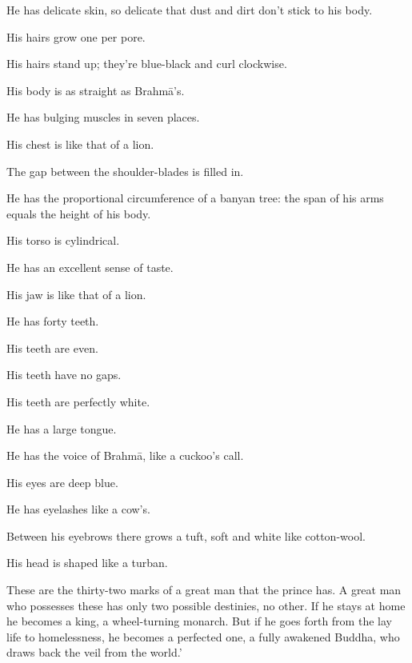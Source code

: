 \documentclass[12pt,openany]{book}%
\begin{document}
He has delicate skin, so delicate that dust and dirt don’t stick to his body. 

His hairs grow one per pore. 

His hairs stand up; they’re blue-black and curl clockwise. 

His body is as straight as \textsanskrit{Brahmā}’s. 

He has bulging muscles in seven places. 

His chest is like that of a lion. 

The gap between the shoulder-blades is filled in. 

He has the proportional circumference of a banyan tree: the span of his arms equals the height of his body. 

His torso is cylindrical. 

He has an excellent sense of taste. 

His jaw is like that of a lion. 

He has forty teeth. 

His teeth are even. 

His teeth have no gaps. 

His teeth are perfectly white. 

He has a large tongue. 

He has the voice of \textsanskrit{Brahmā}, like a cuckoo’s call. 

His eyes are deep blue. 

He has eyelashes like a cow’s. 

Between his eyebrows there grows a tuft, soft and white like cotton-wool. 

His head is shaped like a turban. 

These are the thirty-two marks of a great man that the prince has. A great man who possesses these has only two possible destinies, no other. If he stays at home he becomes a king, a wheel-turning monarch. But if he goes forth from the lay life to homelessness, he becomes a perfected one, a fully awakened Buddha, who draws back the veil from the world.’ 
\end{document}
